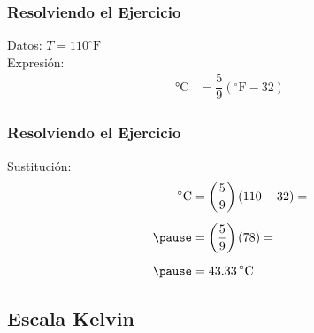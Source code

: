 \documentclass[14pt]{beamer}
\begin{document}
\begin{frame}
\frametitle{Resolviendo el Ejercicio}
Datos: $T = 110 ^{\circ} \text{F}$
\\
\bigskip
\pause
Expresión:
\pause
\begin{align*}
\unit{\degreeCelsius} &= \dfrac{5}{9} \left( ^{\circ}\text{F} - 32 \right)
\end{align*}
\end{frame}
\begin{frame}
\frametitle{Resolviendo el Ejercicio}
Sustitución:
\pause
\begin{eqnarray*}
\begin{aligned}
\unit{\degreeCelsius} &= \left( \dfrac{5}{9} \right) \left( 110 - 32 \right) = \\[0.5em] \pause
&= \left( \dfrac{5}{9} \right) \left( 78 \right) = \\[0.5em] \pause
&= \SI{43.33}{\degreeCelsius}
\end{aligned}
\end{eqnarray*}
\end{frame}

\subsection{Escala Kelvin}
\end{document}
